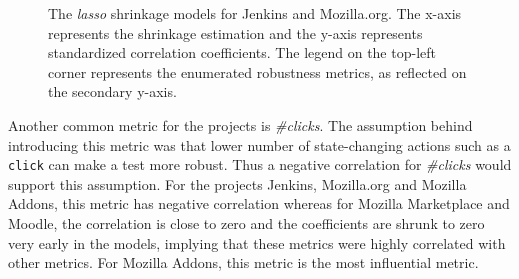 \begin{figure}[htbp!] 
\centering     %
{}
  \captionsetup{justification=justified,
singlelinecheck=false}
\caption{The \textit{lasso} shrinkage models for Jenkins and Mozilla.org. The x-axis represents the shrinkage estimation and the y-axis represents standardized correlation coefficients. The legend on the top-left corner represents the enumerated robustness metrics, as reflected on the secondary y-axis. } 
\label{fig:lasso3}
\end{figure} 

Another common metric for the projects is \textit{\#clicks}. The assumption behind introducing this metric was that lower 
number of state-changing actions such as a \texttt{click} can make a test more robust. Thus a negative correlation for \textit{\#clicks} would support this assumption. For the projects Jenkins, Mozilla.org and Mozilla Addons, this metric has negative correlation whereas for Mozilla Marketplace and Moodle, the correlation is close to zero and the coefficients are shrunk to zero very early in the models, implying that these metrics were highly correlated with other metrics. For Mozilla Addons, this metric is the most influential metric. 

